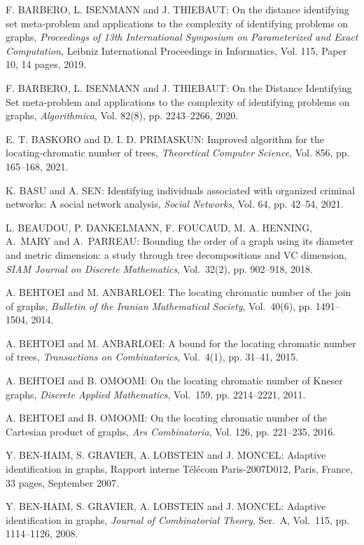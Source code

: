 \begin{thebibliography}{999}
F. BARBERO, L. ISENMANN and J. THIEBAUT: On the distance identifying set meta-problem and applications to the complexity of identifying problems on graphs, {\it Proceedings of 13th International Symposium on Parameterized and Exact Computation}, Leibniz International Proceedings in Informatics, Vol. 115, Paper 10, 14 pages, 2019.

F. BARBERO, L. ISENMANN and J. THIEBAUT: On the Distance Identifying Set meta-problem and applications to the complexity of identifying problems on graphs, {\it Algorithmica}, Vol. 82(8), pp. 2243--2266, 2020.

E. T. BASKORO and D. I. D. PRIMASKUN: Improved algorithm for the locating-chromatic number of trees, {\it Theoretical Computer Science}, Vol. 856, pp. 165--168, 2021.

K. BASU and A. SEN: Identifying individuals associated with organized criminal networks: A social network analysis, {\it Social Networks}, Vol. 64, pp. 42--54, 2021.

L. BEAUDOU, P. DANKELMANN, F. FOUCAUD, M. A. HENNING, A.~MARY and A.~PARREAU: Bounding the order of a graph using its diameter and metric dimension: a study through tree decompositions and VC dimension, {\it SIAM Journal on Discrete Mathematics}, Vol.~32(2), pp. 902--918, 2018.

A. BEHTOEI and M. ANBARLOEI: The locating chromatic number of the join of graphs, {\it Bulletin of the Iranian Mathematical Society}, Vol.~40(6), pp. 1491--1504, 2014.

A. BEHTOEI and M. ANBARLOEI: A bound for the locating chromatic number of trees, {\it Transactions on Combinatorics}, Vol.~4(1), pp. 31--41, 2015.

A. BEHTOEI and B. OMOOMI: On the locating chromatic number of Kneser graphs, {\it Discrete Applied Mathematics}, Vol.~159, pp. 2214--2221, 2011. 


A. BEHTOEI and B. OMOOMI: On the locating chromatic number of the Cartesian product of graphs, {\it Ars Combinatoria}, Vol. 126, pp. 221--235, 2016.
  
Y. BEN-HAIM, S. GRAVIER, A. LOBSTEIN and J. MONCEL: Adaptive identification in graphs, Rapport interne T\'el\'ecom Paris-2007D012, Paris, France, 33 pages, September 2007.

Y. BEN-HAIM, S. GRAVIER, A. LOBSTEIN and J. MONCEL: Adaptive identification in graphs, {\it Journal of Combinatorial Theory}, Ser.~A, Vol.~115, pp. 1114--1126, 2008.


\end{thebibliography}
